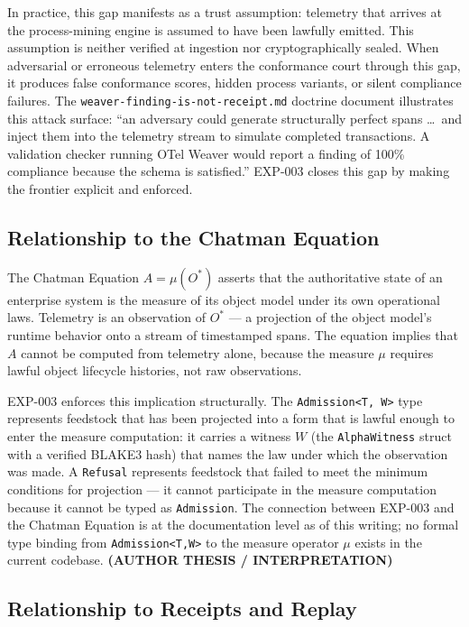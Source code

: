 In practice, this gap manifests as a trust assumption: telemetry that arrives at
the process-mining engine is assumed to have been lawfully emitted. This assumption
is neither verified at ingestion nor cryptographically sealed. When adversarial or
erroneous telemetry enters the conformance court through this gap, it produces false
conformance scores, hidden process variants, or silent compliance failures. The
\texttt{weaver-finding-is-not-receipt.md} doctrine document illustrates this attack
surface: ``an adversary could generate structurally perfect spans \ldots\ and inject
them into the telemetry stream to simulate completed transactions. A validation checker
running OTel Weaver would report a finding of 100\% compliance because the schema is
satisfied.'' EXP-003 closes this gap by making the frontier explicit and enforced.

\subsection{Relationship to the Chatman Equation}
\label{sec:otel-weaver-exp-003-live-check-to-refusal-lineage-equation}

The Chatman Equation $A = \mu(O^*)$ asserts that the authoritative state of an
enterprise system is the measure of its object model under its own operational laws.
Telemetry is an observation of $O^*$ --- a projection of the object model's runtime
behavior onto a stream of timestamped spans. The equation implies that $A$ cannot
be computed from telemetry alone, because the measure $\mu$ requires lawful object
lifecycle histories, not raw observations.

EXP-003 enforces this implication structurally. The \texttt{Admission<T, W>} type
represents feedstock that has been projected into a form that is lawful enough to
enter the measure computation: it carries a witness $W$ (the \texttt{AlphaWitness}
struct with a verified BLAKE3 hash) that names the law under which the observation
was made. A \texttt{Refusal} represents feedstock that failed to meet the minimum
conditions for projection --- it cannot participate in the measure computation because
it cannot be typed as \texttt{Admission}. The connection between EXP-003 and the
Chatman Equation is at the documentation level as of this writing; no formal type
binding from \texttt{Admission<T,W>} to the measure operator $\mu$ exists in the
current codebase. \textbf{(AUTHOR THESIS / INTERPRETATION)}

\subsection{Relationship to Receipts and Replay}
\label{sec:otel-weaver-exp-003-live-check-to-refusal-lineage-receipts}

